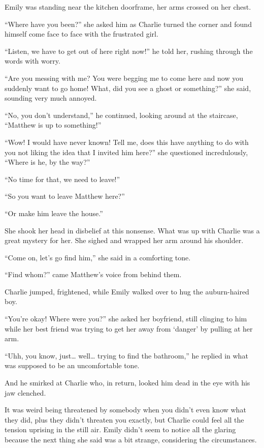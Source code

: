 Emily was standing near the kitchen doorframe, her arms crossed on her chest.

“Where have you been?” she asked him as Charlie turned the corner and found himself come face to face with the frustrated girl.

“Listen, we have to get out of here right now!” he told her, rushing through the words with worry.

“Are you messing with me? You were begging me to come here and now you suddenly want to go home! What, did you see a ghost or something?” she said, sounding very much annoyed.

“No, you don’t understand,” he continued, looking around at the staircase, “Matthew is up to something!”

“Wow! I would have never known! Tell me, does this have anything to do with you not liking the idea that I invited him here?” she questioned incredulously, “Where is he, by the way?”

“No time for that, we need to leave!”

“So you want to leave Matthew here?”

“Or make him leave the house.”

She shook her head in disbelief at this nonsense. What was up with Charlie was a great mystery for her. She sighed and wrapped her arm around his shoulder.

“Come on, let’s go find him,” she said in a comforting tone.

“Find whom?” came Matthew’s voice from behind them.

Charlie jumped, frightened, while Emily walked over to hug the auburn-haired boy.

“You’re okay! Where were you?” she asked her boyfriend, still clinging to him while her best friend was trying to get her away from ‘danger’ by pulling at her arm.

“Uhh, you know, just… well… trying to find the bathroom,” he replied in what was supposed to be an uncomfortable tone.

And he smirked at Charlie who, in return, looked him dead in the eye with his jaw clenched.

It was weird being threatened by somebody when you didn’t even know what they did, plus they didn’t threaten you exactly, but Charlie could feel all the tension uprising in the still air. Emily didn’t seem to notice all the glaring because the next thing she said was a bit strange, considering the circumstances.

